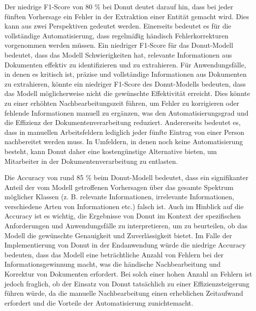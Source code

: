 Der niedrige F1-Score von 80 \% bei Donut deutet darauf hin, dass bei jeder fünften Vorhersage ein Fehler in der Extraktion einer Entität gemacht wird. Dies kann aus zwei Perspektiven gedeutet werden. Einerseits bedeutet es für die vollständige Automatisierung, dass regelmäßig händisch Fehlerkorrekturen vorgenommen werden müssen. Ein niedriger F1-Score für das Donut-Modell bedeutet, dass das Modell Schwierigkeiten hat, relevante Informationen aus Dokumenten effektiv zu identifizieren und zu extrahieren. Für Anwendungsfälle, in denen es kritisch ist, präzise und vollständige Informationen aus Dokumenten zu extrahieren, könnte ein niedriger F1-Score des Donut-Modells bedeuten, dass das Modell möglicherweise nicht die gewünschte Effektivität erreicht. Dies könnte zu einer erhöhten Nachbearbeitungszeit führen, um Fehler zu korrigieren oder fehlende Informationen manuell zu ergänzen, was den Automatisierungsgrad und die Effizienz der Dokumentenverarbeitung reduziert. Andererseits bedeutet es, dass in manuellen Arbeitsfeldern lediglich jeder fünfte Eintrag von einer Person nachbereitet werden muss. In Umfeldern, in denen noch keine Automatisierung besteht, kann Donut daher eine kostengünstige Alternative bieten, um Mitarbeiter in der Dokumentenverarbeitung zu entlasten.

Die Accuracy von rund 85 \% beim Donut-Modell bedeutet, dass ein signifikanter Anteil der vom Modell getroffenen Vorhersagen über das gesamte Spektrum möglicher Klassen (z. B. relevante Informationen, irrelevante Informationen, verschiedene Arten von Informationen etc.) falsch ist. Auch im Hinblick auf die Accuracy ist es wichtig, die Ergebnisse von Donut im Kontext der spezifischen Anforderungen und Anwendungsfälle zu interpretieren, um zu beurteilen, ob das Modell die gewünschte Genauigkeit und Zuverlässigkeit bietet. Im Falle der Implementierung von Donut in der Endanwendung würde die niedrige Accuracy bedeuten, dass das Modell eine beträchtliche Anzahl von Fehlern bei der Informationsgewinnung macht, was die händische Nachbearbeitung und Korrektur von Dokumenten erfordert. Bei solch einer hohen Anzahl an Fehlern ist jedoch fraglich, ob der Einsatz von Donut tatsächlich zu einer Effizienzsteigerung führen würde, da die manuelle Nachbearbeitung einen erheblichen Zeitaufwand erfordert und die Vorteile der Automatisierung zunichtemacht.

